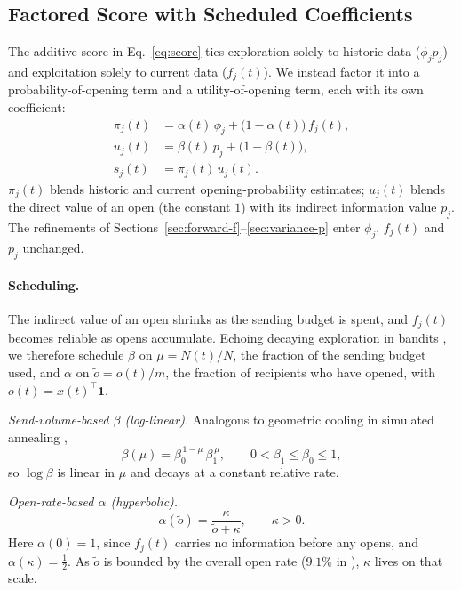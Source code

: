 \subsection{Factored Score with Scheduled Coefficients}
\label{sec:factored-score}

The additive score in Eq.~\eqref{eq:score} ties exploration solely to
historic data ($\phi_j p_j$) and exploitation solely to current data
($f_j(t)$). We instead factor it into a probability-of-opening term and a
utility-of-opening term, each with its own coefficient:
\begin{align}
\pi_j(t) &= \alpha(t)\,\phi_j + \big(1-\alpha(t)\big)\,f_j(t),
  \label{eq:pi}\\
u_j(t) &= \beta(t)\,p_j + \big(1-\beta(t)\big),
  \label{eq:u}\\
s_j(t) &= \pi_j(t)\,u_j(t).
  \label{eq:s-factored}
\end{align}
$\pi_j(t)$ blends historic and current opening-probability estimates;
$u_j(t)$ blends the direct value of an open (the constant $1$) with its
indirect information value $p_j$. The refinements of
Sections~\ref{sec:forward-f}--\ref{sec:variance-p} enter $\phi_j$,
$f_j(t)$ and $p_j$ unchanged.

\paragraph{Scheduling.}
The indirect value of an open shrinks as the sending budget is spent, and
$f_j(t)$ becomes reliable as opens accumulate. Echoing decaying exploration
in bandits \citep{auer2002finite}, we therefore schedule $\beta$ on
$\mu = N(t)/N$, the fraction of the sending budget used, and $\alpha$ on
$\tilde o = o(t)/m$, the fraction of recipients who have opened, with
$o(t) = x(t)^\top\mathbf{1}$.

\emph{Send-volume-based $\beta$ (log-linear).} Analogous to geometric
cooling in simulated annealing \citep{mahdi2017performance},
\begin{equation}
\label{eq:beta-loglinear}
\beta(\mu) = \beta_0^{\,1-\mu}\,\beta_1^{\,\mu},
\qquad 0<\beta_1\le\beta_0\le 1,
\end{equation}
so $\log\beta$ is linear in $\mu$ and decays at a constant relative rate.

\emph{Open-rate-based $\alpha$ (hyperbolic).}
\begin{equation}
\label{eq:alpha-hyperbolic}
\alpha(\tilde o) = \frac{\kappa}{\tilde o + \kappa},
\qquad \kappa>0.
\end{equation}
Here $\alpha(0)=1$, since $f_j(t)$ carries no information before any opens,
and $\alpha(\kappa)=\tfrac12$. As $\tilde o$ is bounded by the overall open
rate ($9.1\%$ in \citealp{zid2025active}), $\kappa$ lives on that scale.
